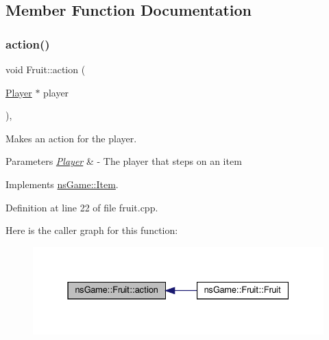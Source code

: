 \subsection{Member Function Documentation}
\mbox{\label{classns_game_1_1_fruit_ad33836a67756dba7390b95c57898e91c}} 
\subsubsection{\texorpdfstring{action()}{action()}}
{\footnotesize\ttfamily void Fruit\+::action (\begin{DoxyParamCaption}\item[{\hyperlink{classns_game_1_1_player}{Player} $\ast$}]{player }\end{DoxyParamCaption})\hspace{0.3cm}{\ttfamily [override]}, {\ttfamily [virtual]}}



Makes an action for the player. 


\begin{DoxyParams}{Parameters}
{\em \hyperlink{classns_game_1_1_player}{Player}} & -\/ The player that steps on an item \\
\hline
\end{DoxyParams}


Implements \hyperlink{structns_game_1_1_item_af74dffcf9bde4a4297749f4e1852395b}{ns\+Game\+::\+Item}.



Definition at line 22 of file fruit.\+cpp.

Here is the caller graph for this function\+:\nopagebreak
\begin{figure}[H]
\begin{center}
\leavevmode
\includegraphics[width=331pt]{classns_game_1_1_fruit_ad33836a67756dba7390b95c57898e91c_icgraph}
\end{center}
\end{figure}
\mbox{\label{classns_game_1_1_fruit_a4d704f296f536afc2980183bb21e4c62}} 
